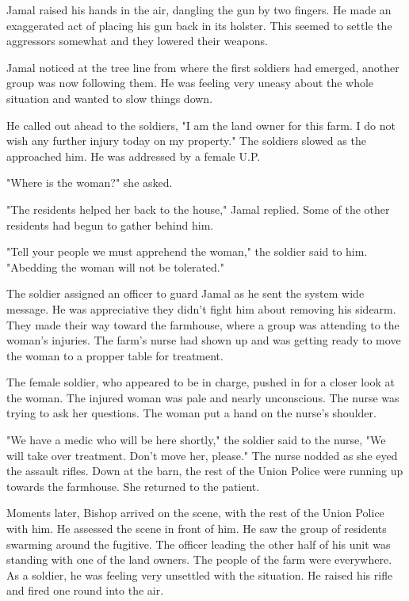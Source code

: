 \documentclass[courier]{sffms}
\begin{document}
Jamal raised his hands in the air, dangling the gun
by two fingers. He made an exaggerated act of
placing his gun back in its holster. This seemed to
settle the aggressors somewhat and they lowered
their weapons.

Jamal noticed at the tree line from where the 
first soldiers had emerged, another group was 
now following them. He was feeling very
uneasy about the whole situation and wanted
to slow things down.

He called out ahead to the soldiers, "I am the land owner
for this farm. I do not wish any further injury today
on my property." The soldiers slowed as the 
approached him. He was addressed by a female U.P.

"Where is the woman?" she asked.

"The residents helped her back to the house," Jamal 
replied. Some of the other residents had begun
to gather behind him.

"Tell your people we must apprehend the woman,"
the soldier said to him. "Abedding the woman
will not be tolerated."

The soldier assigned an officer to guard Jamal as
he sent the system wide message. He was
appreciative they didn't fight him about
removing his sidearm. They made their way
toward the farmhouse, where a group was
attending to the woman's injuries. The farm's
nurse had shown up and was getting ready to
move the woman to a propper table for treatment.

The female soldier, who appeared to be in charge,
pushed in for a closer look at the woman.
The injured woman was pale and nearly
unconscious. The nurse was trying to ask her
questions. The woman put a hand on the 
nurse's shoulder.

"We have a medic who will be here shortly,"
the soldier said to the nurse, "We will
take over treatment. Don't move her, please."
The nurse nodded as she eyed the assault
rifles. Down at the barn, the rest of the
Union Police were running up towards
the farmhouse. She returned to the patient.

Moments later, Bishop arrived on the scene,
with the rest of the Union Police with him.
He assessed the scene in front of him. He saw the group
of residents swarming around the fugitive.
The officer leading the other half of his unit
was standing with one of the land owners.
The people of the farm were everywhere. As a
soldier, he was feeling very unsettled with the
situation. He raised his rifle and fired one
round into the air.
\end{document}
